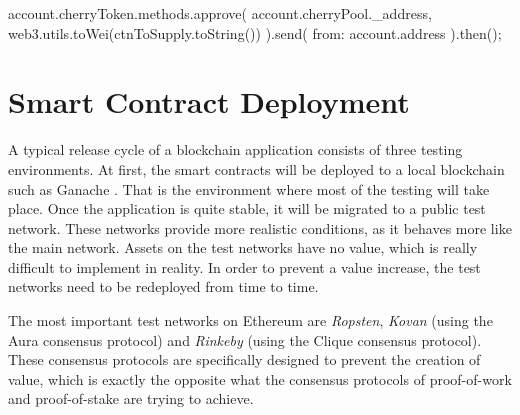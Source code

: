 \begin{JsCode}
account.cherryToken.methods.approve(
  account.cherryPool._address,
  web3.utils.toWei(ctnToSupply.toString())
).send({ from: account.address }).then();	
\end{JsCode}


\section{Smart Contract Deployment}
\label{sec:deployment}

A typical release cycle of a blockchain application consists of three testing environments. At first, the smart contracts will be deployed to a local blockchain such as Ganache \cite{Ganache}. That is the environment where most of the testing will take place. Once the application is quite stable, it will be migrated to a public test network. These networks provide more realistic conditions, as it behaves more like the main network. Assets on the test networks have no value, which is really difficult to implement in reality. In order to prevent a value increase, the test networks need to be redeployed from time to time.

The most important test networks on Ethereum are \textit{Ropsten}, \textit{Kovan} (using the Aura consensus protocol) and \textit{Rinkeby} (using the Clique consensus protocol). These consensus protocols are specifically designed to prevent the creation of value, which is exactly the opposite what the consensus protocols of proof-of-work and proof-of-stake are trying to achieve.